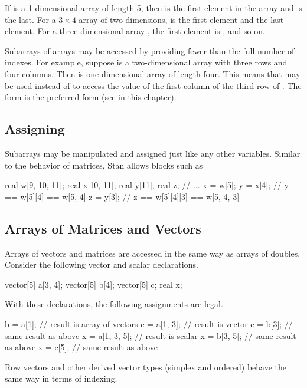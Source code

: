 If  is a 1-dimensional array of length 5, then  is
the first element in the array and  is the last.  For a $3
\times 4$ array  of two dimensions,  is the first
element and  the last element.  For a three-dimensional
array , the first element is , and so on.

Subarrays of arrays may be accessed by providing fewer than the full
number of indexes.  For example, suppose  is a two-dimensional
array with three rows and four columns.  Then  is
one-dimensional array of length four.  This means that 
may be used instead of  to access the value of the first
column of the third row of .  The form  is the
preferred form (see  in this chapter).

\subsection{Assigning}

Subarrays may be manipulated and assigned just like any other
variables.  Similar to the behavior of matrices, Stan allows blocks
such as
%
\begin{stancode}
real w[9, 10, 11];
real x[10, 11];
real y[11];
real z;
// ...
x = w[5];
y = x[4];  // y == w[5][4] == w[5, 4]
z = y[3];  // z == w[5][4][3] == w[5, 4, 3]
\end{stancode}
%


\subsection{Arrays of Matrices and Vectors}

Arrays of vectors and matrices are accessed in the same way as arrays
of doubles.  Consider the following vector and scalar declarations.
%
\begin{stancode}
vector[5] a[3, 4];
vector[5] b[4];
vector[5] c;
real x;
\end{stancode}
%
With these declarations, the following assignments are legal.
%
\begin{stancode}
b = a[1];      // result is array of vectors
c = a[1, 3];    // result is vector
c = b[3];      //   same result as above
x = a[1, 3, 5];  // result is scalar
x = b[3, 5];    //   same result as above
x = c[5];      //   same result as above
\end{stancode}
%
Row vectors and other derived vector types (simplex and ordered)
behave the same way in terms of indexing.

